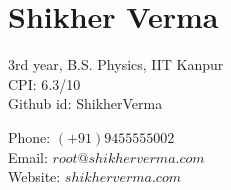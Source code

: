 \documentclass[a4paper]{article}
\author{Shikher Verma}
\begin{document}
\section*{\huge\textbf Shikher Verma}
\begin{minipage}{.45\linewidth}
	\begin{flushleft}
		3rd year, B.S. Physics, IIT Kanpur\\
		CPI: 6.3/10\\
		Github id: ShikherVerma\\
	\end{flushleft}
\end{minipage}
\hfill
\begin{minipage}{.45\linewidth}
	\begin{flushright}
		Phone: $(+91)9455555002$\\
		Email: $root@shikherverma.com$\\
		Website: $shikherverma.com$\\
	\end{flushright}
\end{minipage}

\end{document}
